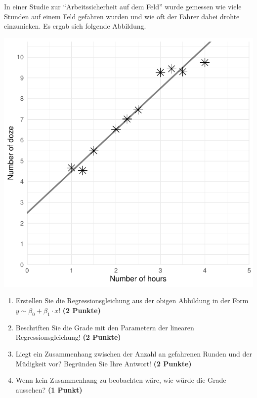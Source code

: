 \documentclass[a4paper, 9pt]{scrartcl}\usepackage[]{graphicx}\usepackage[]{xcolor}
\makeatletter
\def\maxwidth{ %
  \ifdim\Gin@nat@width>\linewidth
    \linewidth
  \else
    \Gin@nat@width
  \fi
}
\makeatother
\begin{document}
In einer Studie zur "`Arbeitssicherheit auf dem Feld"' wurde gemessen wie viele
Stunden auf einem Feld gefahren wurden und wie oft der Fahrer dabei drohte
einzunicken. Es ergab sich folgende Abbildung. 



{\centering \includegraphics[width=\maxwidth]{img/scatter-02-1} 

}




\begin{enumerate}
\item Erstellen Sie die Regressionsgleichung aus der obigen Abbildung in
  der Form $y \sim \beta_0 + \beta_1 \cdot x$! \textbf{(2 Punkte)}
\item Beschriften Sie die Grade mit den Parametern der linearen
  Regressionsgleichung! \textbf{(2 Punkte)}
\item Liegt ein Zusammenhang zwischen der Anzahl an gefahrenen Runden und
  der M{\"u}digkeit vor? Begr{\"u}nden Sie Ihre Antwort! \textbf{(2 Punkte)}
\item Wenn kein Zusammenhang zu beobachten w{\"a}re, wie w{\"u}rde die Grade aussehen? \textbf{(1 Punkt)}
\end{enumerate} 
\clearpage
\end{document}
